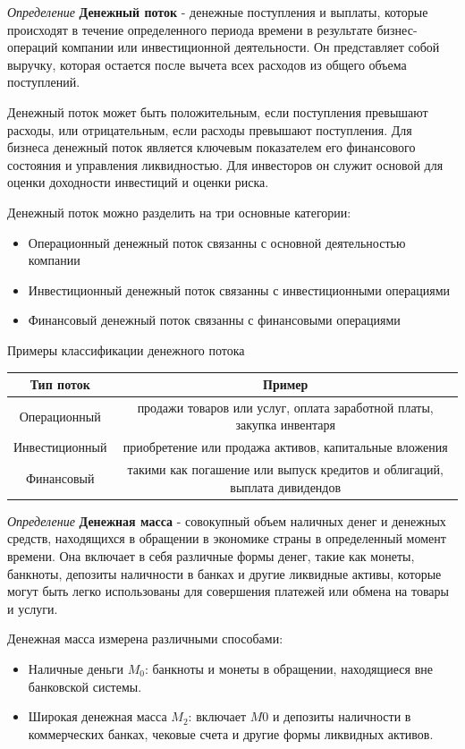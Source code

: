 
\textit{Определение} \textbf{Денежный поток} - денежные поступления и выплаты, которые происходят в течение определенного периода времени в результате бизнес-операций компании или инвестиционной деятельности. 
Он представляет собой выручку, которая остается после вычета всех расходов из общего объема поступлений. 

Денежный поток может быть положительным, если поступления превышают расходы, или отрицательным, если расходы превышают поступления. 
Для бизнеса денежный поток является ключевым показателем его финансового состояния и управления ликвидностью. Для инвесторов он служит основой для оценки доходности инвестиций и оценки риска. 

Денежный поток можно разделить на три основные категории:
\begin{itemize}
    \item Операционный денежный поток связанны с основной деятельностью компании
    \item Инвестиционный денежный поток связанны с инвестиционными операциями
    \item Финансовый денежный поток связанны с финансовыми операциями
\end{itemize}

Примеры классификации денежного потока
\begin{center}
    \begin{tabular}{ |c|c|} 
    Тип поток & Пример \\
     \hline
     Операционный  &  продажи товаров или услуг, оплата заработной платы, закупка инвентаря  \\ 
     Инвестиционный &приобретение или продажа активов, капитальные вложения \\ 
     Финансовый & такими как погашение или выпуск кредитов и облигаций, выплата дивидендов \\ 
     \hline
    \end{tabular}
\end{center}


\textit{Определение} \textbf{Денежная масса} - совокупный объем наличных денег и денежных средств, находящихся в обращении в экономике страны в определенный момент времени. 
Она включает в себя различные формы денег, такие как монеты, банкноты, депозиты наличности в банках и другие ликвидные активы, которые могут быть легко использованы для совершения платежей или обмена на товары и услуги.

Денежная масса измерена различными способами:
\begin{itemize}
    \item  Наличные деньги $M_0$: банкноты и монеты в обращении, находящиеся вне банковской системы.
    \item Широкая денежная масса $M_2$: включает $M0$ и депозиты наличности в коммерческих банках, чековые счета и другие формы ликвидных активов.
\end{itemize}

